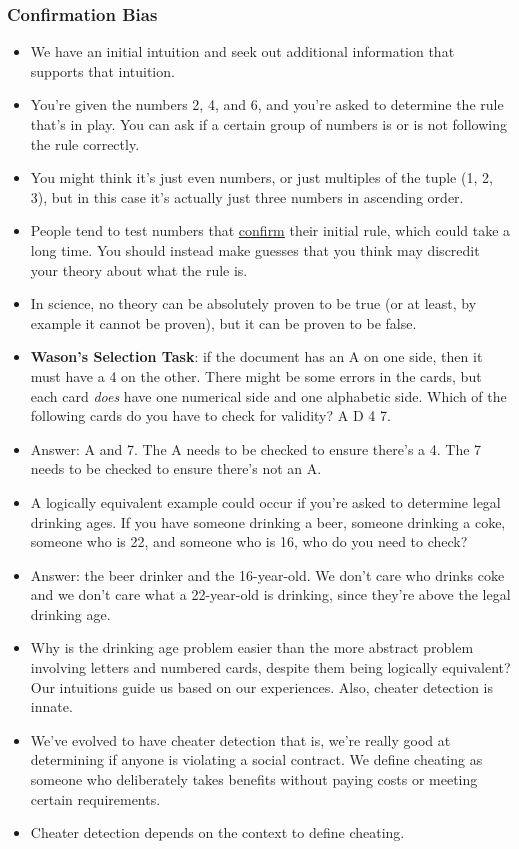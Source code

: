 \documentclass[]{article}
\begin{document}
			\subsubsection{Confirmation Bias}
				\begin{itemize}
					\item We have an initial intuition and seek out additional information that supports that intuition.
					\item You're given the numbers 2, 4, and 6, and you're asked to determine the rule that's in play. You can ask if a certain group of numbers is or is not following the rule correctly.
					\item You might think it's just even numbers, or just multiples of the tuple (1, 2, 3), but in this case it's actually just three numbers in ascending order.
					\item People tend to test numbers that \underline{confirm} their initial rule, which could take a long time. You should instead make guesses that you think may discredit your theory about what the rule is.
					\item In science, no theory can be absolutely proven to be true (or at least, by example it cannot be proven), but it can be proven to be false.
					\item \textbf{Wason's Selection Task}: if the document has an A on one side, then it must have a 4 on the other. There might be some errors in the cards, but each card \emph{does} have one numerical side and one alphabetic side. Which of the following cards do you have to check for validity? A D 4 7.
					\item Answer: A and 7. The A needs to be checked to ensure there's a 4. The 7 needs to be checked to ensure there's not an A.
					\item A logically equivalent example could occur if you're asked to determine legal drinking ages. If you have someone drinking a beer, someone drinking a coke, someone who is 22, and someone who is 16, who do you need to check?
					\item Answer: the beer drinker and the 16-year-old. We don't care who drinks coke and we don't care what a 22-year-old is drinking, since they're above the legal drinking age.
					\item Why is the drinking age problem easier than the more abstract problem involving letters and numbered cards, despite them being logically equivalent? Our intuitions guide us based on our experiences. Also, cheater detection is innate.
					\item We've evolved to have cheater detection \textendash{} that is, we're really good at determining if anyone is violating a social contract. We define cheating as someone who deliberately takes benefits without paying costs or meeting certain requirements.
					\item Cheater detection depends on the context to define cheating.
				\end{itemize}
\end{document}
